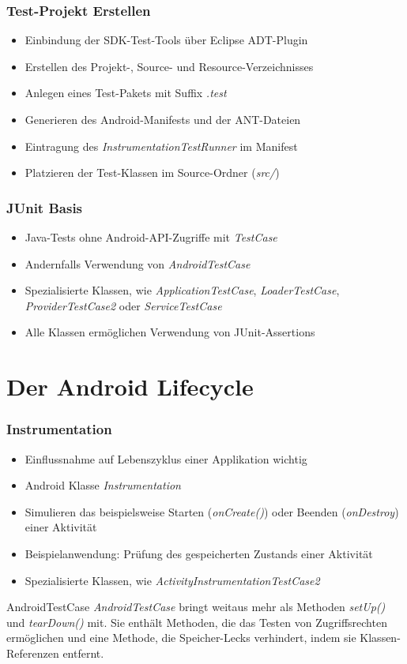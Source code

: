 \begin{frame}
	\frametitle{Test-Projekt Erstellen}
	\begin{itemize}
		\item Einbindung der SDK-Test-Tools über Eclipse ADT-Plugin
		\item Erstellen des Projekt-, Source- und Resource-Verzeichnisses
		\item Anlegen eines Test-Pakets mit Suffix \emph{.test}
		\item Generieren des Android-Manifests und der ANT-Dateien
		\item Eintragung des \emph{InstrumentationTestRunner} im Manifest
		\item Platzieren der Test-Klassen im Source-Ordner (\emph{src/})
	\end{itemize}
\end{frame}

\begin{frame}
	\frametitle{JUnit Basis}
	\begin{itemize}
		\item Java-Tests ohne Android-API-Zugriffe mit \emph{TestCase}
		\item Andernfalls Verwendung von \emph{AndroidTestCase}
		\item Spezialisierte Klassen, wie \emph{ApplicationTestCase}, 
			\emph{LoaderTestCase}, \emph{ProviderTestCase2} oder \emph{ServiceTestCase}
		\item Alle Klassen ermöglichen Verwendung von JUnit-Assertions
	\end{itemize}
\end{frame}

\section{Der Android Lifecycle}

\begin{frame}
	\frametitle{Instrumentation}
	\begin{itemize}
		\item Einflussnahme auf Lebenszyklus einer Applikation wichtig
		\item Android Klasse \emph{Instrumentation}
		\item Simulieren das beispielsweise Starten (\emph{onCreate()}) 
			oder Beenden (\emph{onDestroy}) einer Aktivität
		\item Beispielanwendung: Prüfung des gespeicherten Zustands einer Aktivität
		\item Spezialisierte Klassen, wie \emph{ActivityInstrumentationTestCase2}
	\end{itemize}
	
	\begin{alertblock}{AndroidTestCase}
		\emph{AndroidTestCase} bringt weitaus mehr als Methoden \emph{setUp()} und \emph{tearDown()} mit. 
		Sie enthält Methoden, die das Testen von Zugriffsrechten ermöglichen und 
		eine Methode, die Speicher-Lecks verhindert, indem sie Klassen-Referenzen entfernt.
	\end{alertblock}
\end{frame}

